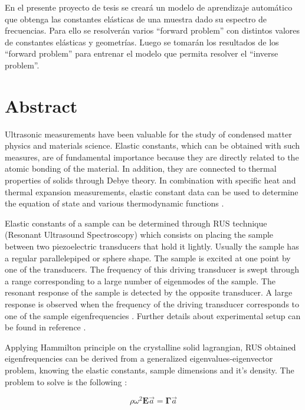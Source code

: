 \documentclass[12pt]{article}
\begin{document}
En el presente proyecto de tesis se creará un modelo de aprendizaje automático que obtenga las constantes elásticas de una muestra dado su espectro de frecuencias. Para ello se resolverán varios ``forward problem'' con distintos valores de constantes elásticas y geometrías. Luego se tomarán los resultados de los ``forward problem'' para entrenar el modelo que permita resolver el ``inverse problem''.

\section{Abstract}
Ultrasonic measurements have been valuable for the study of condensed matter physics and materials science. Elastic constants, which can be obtained with such measures, are of fundamental importance because they are directly related to the atomic bonding of the material. In addition, they are connected to thermal properties of solids through Debye theory. In combination with specific heat and thermal expansion measurements, elastic constant data can be used to determine the equation of state and various thermodynamic functions \cite{Leisure_1997}.

Elastic constants of a sample can be determined through RUS technique (Resonant Ultrasound Spectroscopy) which consists on placing the sample between two piezoelectric transducers that hold it lightly. Usually the sample has a regular parallelepiped or sphere shape. The sample is excited at one point by one of the transducers. The frequency of this driving transducer is swept through a range corresponding to a large number of eigenmodes of the sample. The resonant response of the sample is detected by the opposite transducer. A large response is observed when the frequency of the driving transducer corresponds to one of the sample eigenfrequencies \cite{Leisure_1997}. Further details about experimental setup can be found in reference \cite{MIGLIORI19931}.

Applying Hammilton principle on the crystalline solid lagrangian, RUS obtained eigenfrequencies can be derived from a generalized eigenvalues-eigenvector problem, knowing the elastic constants, sample dimensions and it's density. The problem to solve is the following \cite{Leisure_1997}:

\begin{equation}
    \rho \omega^2 \bm{E} \vec{a} = \bm{\Gamma} \vec{a} 
\end{equation}
\end{document}
